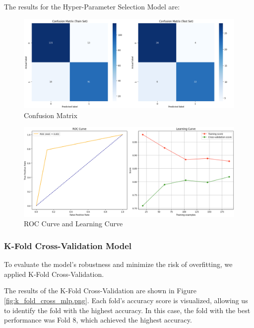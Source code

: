 The results for the Hyper-Parameter Selection Model are:
\begin{figure}[H]
    \centering
    \includegraphics[width=1\linewidth]{images/confusion_matrix_mlp_search.png}
    \caption{Confusion Matrix}
    \label{fig:enter-label}
\end{figure}
\begin{figure}[H]
    \centering
    \includegraphics[width=1\linewidth]{images/roc_learning_mlp_search.png}
    \caption{ROC Curve and Learning Curve}%
    \label{fig:enter-label}
\end{figure}


\subsubsection{K-Fold Cross-Validation Model}

To evaluate the model's robustness and minimize the risk of overfitting, we applied K-Fold Cross-Validation. 

The results of the K-Fold Cross-Validation are shown in Figure \ref{fig:k_fold_cross_mlp.png}. Each fold's accuracy score is visualized, allowing us to identify the fold with the highest accuracy. In this case, the fold with the best performance was Fold 8, which achieved the highest accuracy.

